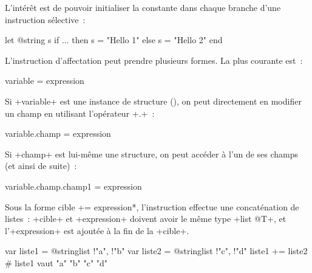 L'intérêt est de pouvoir initialiser la constante dans chaque branche d'une instruction sélective~:
\begin{galgas4}
let @string s
if ... then
  s = "Hello 1"
else
  s = "Hello 2"
end
\end{galgas4}













L'instruction d'affectation peut prendre plusieurs formes. La plus courante est~:

\begin{galgas4box}
variable = expression
\end{galgas4box}

Si \ggsq+variable+ est une instance de structure (), on peut directement en modifier un champ en utilisant l'opérateur \ggsq+.+~:

\begin{galgas4box}
variable.champ = expression
\end{galgas4box}

Si \ggsq+champ+ est lui-même une structure, on peut accéder à l'un de ses champs (et ainsi de suite)~:

\begin{galgas4box}
variable.champ.champ1 = expression
\end{galgas4box}















Sous la forme \ggsq*cible += expression*, l'instruction effectue une concaténation de listes~: \ggsq+cible+ et \ggsq+expression+ doivent avoir le même type \ggsq+list @T+, et l'\ggsq+expression+ est ajoutée à la fin de la \ggsq+cible+.

\begin{galgas4}
var liste1 = @stringlist {!"a", !"b"}
var liste2 = @stringlist {!"c", !"d"}
liste1 += liste2 # liste1 vaut "a" "b" "c" "d"
\end{galgas4}



